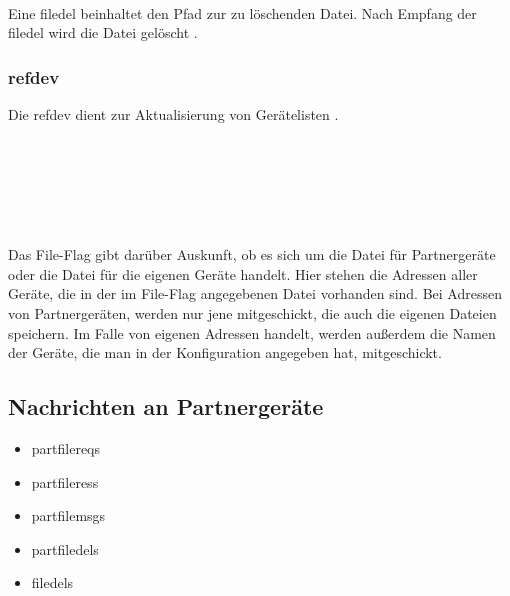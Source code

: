 	\begin{rightwordgroup}{\isprotomsgtype}
	\end{rightwordgroup} \\
	
	\begin{rightwordgroup}{\isprotomsgdata}
		 \\
		\skippedwords \\
	\end{rightwordgroup}
	
Eine \gls{filedel} beinhaltet den Pfad zur zu löschenden Datei. Nach Empfang der \gls{filedel} wird die Datei gelöscht .

\subsubsection{\gls{refdev}}
Die \gls{refdev} dient zur Aktualisierung von Gerätelisten .
\messagestart
	 \\
	
	\begin{rightwordgroup}{\isprotomsgtype}
	\end{rightwordgroup} \\
	
	\begin{rightwordgroup}{\isprotomsgdata}
		 \\
		 \\
		\skippedwords \\
	\end{rightwordgroup} 
	
\begin{description}
	Das File-Flag gibt darüber Auskunft, ob es sich um die Datei für Partnergeräte oder die Datei für die eigenen Geräte handelt.
	Hier stehen die Adressen aller Geräte, die in der im File-Flag angegebenen Datei vorhanden sind. Bei Adressen von Partnergeräten, werden nur jene mitgeschickt, die auch die eigenen Dateien speichern. Im Falle von eigenen Adressen handelt, werden außerdem die Namen der Geräte, die man in der Konfiguration angegeben hat, mitgeschickt.
\end{description}

\subsection{Nachrichten an Partnergeräte}
\begin{itemize}
	\item \gls{partfilereq}s
	\item \gls{partfileres}s
	\item \gls{partfilemsg}s
	\item \gls{partfiledel}s
	\item \gls{filedel}s
\end{itemize}

